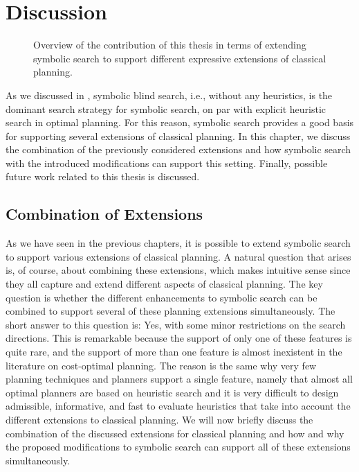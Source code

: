 \chapter{Discussion}\label{ch:discussion}

\renewcommand{\kiviatTopk}{2}
\renewcommand{\kiviatGoal}{2}
\renewcommand{\kiviatCost}{2}
\renewcommand{\kiviatPredicates}{2}
\begin{figure}[t]
    \begin{center}
        
    \end{center}
    \caption[Overview of the contribution of this thesis.]{
        Overview of the contribution of this thesis in terms of extending symbolic search to support different expressive extensions of classical planning.
    }\label{fig:dicussion:kiviat}
\end{figure}


As we discussed in , symbolic blind search, i.e., without any heuristics, is the dominant search strategy for symbolic search, on par with explicit heuristic search in optimal planning.
For this reason, symbolic search provides a good basis for supporting several extensions of classical planning.
In this chapter, we discuss the combination of the previously considered extensions and how symbolic search with the introduced modifications can support this setting.
Finally, possible future work related to this thesis is discussed.

\section{Combination of Extensions}\label{sec:combination}
As we have seen in the previous chapters, it is possible to extend symbolic search to support various extensions of classical planning.
A natural question that arises is, of course, about combining these extensions, which makes intuitive sense since they all capture and extend different aspects of classical planning.
The key question is whether the different enhancements to symbolic search can be combined to support several of these planning extensions simultaneously.
The short answer to this question is: Yes, with some minor restrictions on the search directions.
This is remarkable because the support of only one of these features is quite rare, and the support of more than one feature is almost inexistent in the literature on cost-optimal planning.
The reason is the same why very few planning techniques and planners support a single feature, namely that almost all optimal planners are based on heuristic search and it is very difficult to design admissible, informative, and fast to evaluate heuristics that take into account the different extensions to classical planning.
We will now briefly discuss the combination of the discussed extensions for classical planning and how and why the proposed modifications to symbolic search can support all of these extensions simultaneously.


